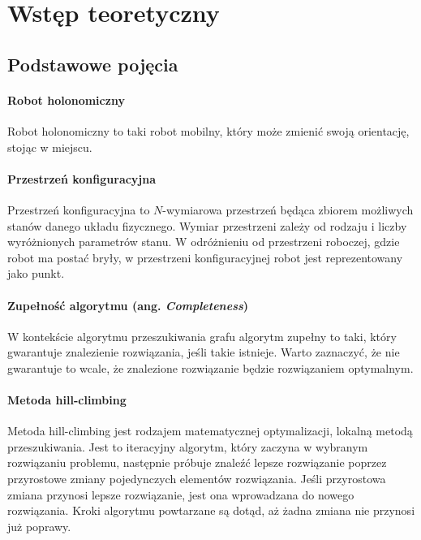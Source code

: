 \chapter{Wstęp teoretyczny}
\label{ch:theory}

\section{Podstawowe pojęcia}
\subsubsection{Robot holonomiczny}
Robot holonomiczny to taki robot mobilny, który może zmienić swoją orientację, stojąc w miejscu.

\subsubsection{Przestrzeń konfiguracyjna}
Przestrzeń konfiguracyjna to $N$-wymiarowa przestrzeń będąca zbiorem możliwych stanów danego układu fizycznego.
Wymiar przestrzeni zależy od rodzaju i liczby wyróżnionych parametrów stanu.
W odróżnieniu od przestrzeni roboczej, gdzie robot ma postać bryły, w przestrzeni konfiguracyjnej robot jest reprezentowany jako punkt.

\subsubsection{Zupełność algorytmu (ang. {\it Completeness})}
W kontekście algorytmu przeszukiwania grafu algorytm zupełny to taki, który gwarantuje znalezienie rozwiązania, jeśli takie istnieje.
Warto zaznaczyć, że nie gwarantuje to wcale, że znalezione rozwiązanie będzie rozwiązaniem optymalnym.

\subsubsection{Metoda hill-climbing}
Metoda hill-climbing jest rodzajem matematycznej optymalizacji, lokalną metodą przeszukiwania.
Jest to iteracyjny algorytm, który zaczyna w wybranym rozwiązaniu problemu, następnie próbuje znaleźć lepsze rozwiązanie poprzez przyrostowe zmiany pojedynczych elementów rozwiązania.
Jeśli przyrostowa zmiana przynosi lepsze rozwiązanie, jest ona wprowadzana do nowego rozwiązania.
Kroki algorytmu powtarzane są dotąd, aż żadna zmiana nie przynosi już poprawy.
